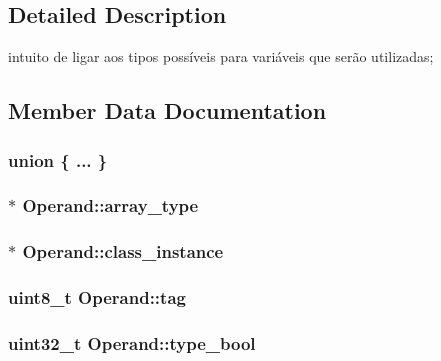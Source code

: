 \subsection{Detailed Description}
intuito de ligar aos tipos possíveis para variáveis que serão utilizadas; 

\subsection{Member Data Documentation}
\subsubsection[{\texorpdfstring{"@16}{@16}}]{\setlength{\rightskip}{0pt plus 5cm}union \{ ... \} }\hypertarget{struct_operand_aadc70ab04271d71be5ac82ac2a896e74}{}\label{struct_operand_aadc70ab04271d71be5ac82ac2a896e74}
\subsubsection[{\texorpdfstring{array\+\_\+type}{array_type}}]{$\ast$ Operand\+::array\+\_\+type}\hypertarget{struct_operand_a79ddf8db90ba729dcee75f0f6669a8ca}{}\label{struct_operand_a79ddf8db90ba729dcee75f0f6669a8ca}
\subsubsection[{\texorpdfstring{class\+\_\+instance}{class_instance}}]{$\ast$ Operand\+::class\+\_\+instance}\hypertarget{struct_operand_a9afc0307304efd6930acb371bdabe4c2}{}\label{struct_operand_a9afc0307304efd6930acb371bdabe4c2}
\subsubsection[{\texorpdfstring{tag}{tag}}]{\setlength{\rightskip}{0pt plus 5cm}uint8\+\_\+t Operand\+::tag}\hypertarget{struct_operand_a551b2888783546b27f90b70f5ceeafee}{}\label{struct_operand_a551b2888783546b27f90b70f5ceeafee}
\subsubsection[{\texorpdfstring{type\+\_\+bool}{type_bool}}]{\setlength{\rightskip}{0pt plus 5cm}uint32\+\_\+t Operand\+::type\+\_\+bool}\hypertarget{struct_operand_a0705136abc78d06866591f4a1304163b}{}\label{struct_operand_a0705136abc78d06866591f4a1304163b}

